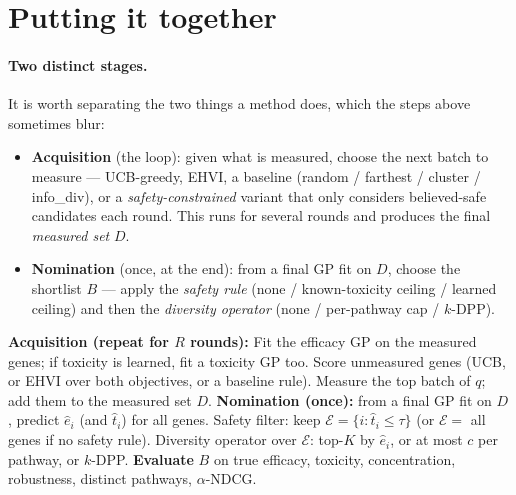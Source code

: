 \documentclass[11pt]{article}
\begin{document}
\section{Putting it together}\label{sec:together}

\paragraph{Two distinct stages.} It is worth separating the two things a method does, which
the steps above sometimes blur:
\begin{itemize}[leftmargin=2em,itemsep=1pt]
\item \textbf{Acquisition} (the loop): given what is measured, choose the next batch to
measure --- UCB-greedy, EHVI, a baseline (random / farthest / cluster / info\_div), or a
\emph{safety-constrained} variant that only considers believed-safe candidates each round.
This runs for several rounds and produces the final \emph{measured set} $D$.
\item \textbf{Nomination} (once, at the end): from a final GP fit on $D$, choose the
shortlist $B$ --- apply the \emph{safety rule} (none / known-toxicity ceiling / learned
ceiling) and then the \emph{diversity operator} (none / per-pathway cap / $k$-DPP).
\end{itemize}

\begin{algorithm}[h]
\caption{One round of acquisition, then final nomination}
\begin{algorithmic}[1]
\State \textbf{Acquisition (repeat for $R$ rounds):}
\State \quad Fit the efficacy GP on the measured genes; if toxicity is learned, fit a toxicity GP too.
\State \quad Score unmeasured genes (UCB, or EHVI over both objectives, or a baseline rule).
\State \quad Measure the top batch of $q$; add them to the measured set $D$.
\State \textbf{Nomination (once):} from a final GP fit on $D$, predict $\hat e_i$ (and $\hat t_i$) for all genes.
\State \quad Safety filter: keep $\mathcal{E}=\{i:\hat t_i\le\tau\}$ (or $\mathcal{E}=$ all genes if no safety rule).
\State \quad Diversity operator over $\mathcal{E}$: top-$K$ by $\hat e_i$, or at most $c$ per pathway, or $k$-DPP.
\State \textbf{Evaluate} $B$ on true efficacy, toxicity, concentration, robustness, distinct pathways, $\alpha$-NDCG.
\end{algorithmic}
\end{algorithm}
\end{document}
